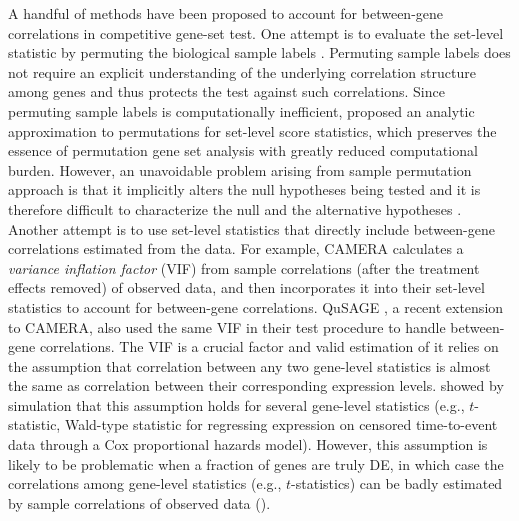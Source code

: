 	A handful of methods have been proposed to account for between-gene correlations in competitive 
	gene-set test. One attempt is to evaluate the set-level statistic by permuting the biological 
	sample labels \citep{efron2007testing,subramanian2005gene}. Permuting sample labels
	does not require an explicit understanding of the underlying correlation structure among genes 
	and thus protects the test against such correlations. Since permuting sample labels is 
	computationally	inefficient, \citet{zhou2013empirical} proposed an analytic approximation to 
	permutations for set-level score statistics, which preserves the essence of permutation gene 
	set analysis with greatly reduced computational burden. However, an unavoidable problem arising 
	from sample	permutation approach is that it implicitly alters the null hypotheses being 
	tested and it is therefore difficult to characterize the null and the alternative hypotheses
	\citep{goeman2007analyzing, khatri2012ten, wu2012camera}. Another attempt is to use set-level
	statistics that directly include between-gene correlations estimated from the data. For 
	example, CAMERA \citep{wu2012camera} calculates a \textit{variance inflation factor} (VIF) from 
	sample correlations (after the treatment effects removed) of observed data, and then 
	incorporates it into their set-level statistics to account for between-gene correlations. 
	QuSAGE \citep{yaari2013quantitative}, a recent
	extension to CAMERA, also used the same VIF in their test procedure to handle between-gene 
	correlations. The VIF is a crucial factor and valid estimation of it
	relies on the assumption that correlation between any two gene-level statistics is almost the 
	same as correlation between their corresponding expression levels. \citet{barry2008statistical} 
	showed by simulation that this assumption holds for several gene-level statistics
	(e.g., $t$-statistic, Wald-type statistic for regressing expression on censored time-to-event 
	data through a Cox proportional hazards model). However, this assumption is likely to be 
	problematic when a fraction of genes are  truly DE, in which case the correlations among 
	gene-level	statistics (e.g., $t$-statistics) can be badly estimated by sample correlations of 
	observed data (\thepapertobefinished). 
	
